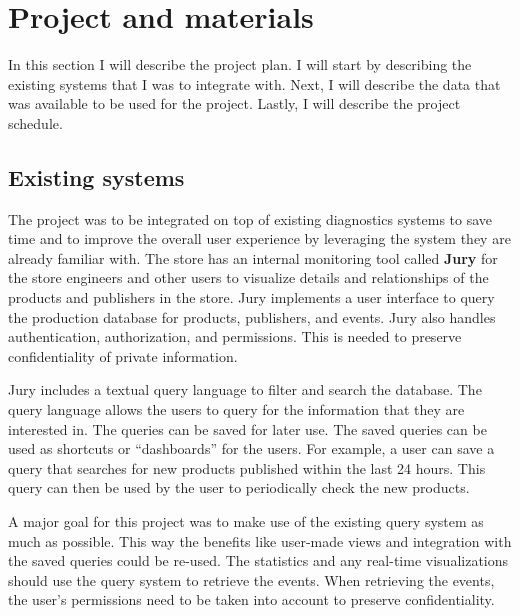 
\clearpage
\section{Project and materials}
\label{sec:materials}

In this section I will describe the project plan.
I will start by describing the existing systems that I was to integrate with.
Next, I will describe the data that was available to be used for the project. 
Lastly, I will describe the project schedule.

\subsection{Existing systems}

The project was to be integrated on top of existing diagnostics systems to save time and to improve the overall user experience by leveraging the system they are already familiar with.
The store has an internal monitoring tool called \textbf{Jury} for the store engineers and other users to visualize details and relationships of the products and publishers in the store.
Jury implements a user interface to query the production database for products, publishers, and events.
Jury also handles authentication, authorization, and permissions.
This is needed to preserve confidentiality of private information.

Jury includes a textual query language to filter and search the database.
The query language allows the users to query for the information that they are interested in.
The queries can be saved for later use. 
The saved queries can be used as shortcuts or ``dashboards'' for the users.
For example, a user can save a query that searches for new products published within the last 24 hours.
This query can then be used by the user to periodically check the new products.

A major goal for this project was to make use of the existing query system as much as possible.
This way the benefits like user-made views and integration with the saved queries could be re-used.
The statistics and any real-time visualizations should use the query system to retrieve the events.
When retrieving the events, the user's permissions need to be taken into account to preserve confidentiality.

